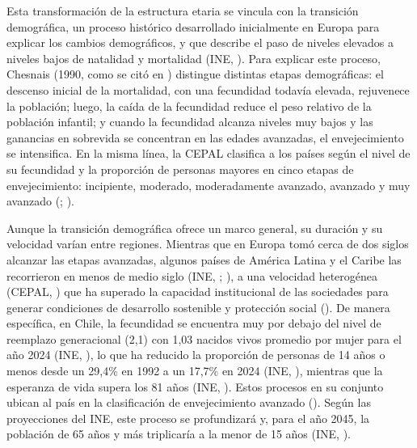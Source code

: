 \documentclass[
  spanish,
  a4paper,
  oneside]{scrbook}
\begin{document}
Esta transformación de la estructura etaria se vincula con la transición
demográfica, un proceso histórico desarrollado inicialmente en Europa
para explicar los cambios demográficos, y que describe el paso de
niveles elevados a niveles bajos de natalidad y mortalidad (INE,
). Para explicar este proceso,
Chesnais (1990, como se citó en
) distingue
distintas etapas demográficas: el descenso inicial de la mortalidad, con
una fecundidad todavía elevada, rejuvenece la población; luego, la caída
de la fecundidad reduce el peso relativo de la población infantil; y
cuando la fecundidad alcanza niveles muy bajos y las ganancias en
sobrevida se concentran en las edades avanzadas, el envejecimiento se
intensifica. En la misma línea, la CEPAL clasifica a los países según el
nivel de su fecundidad y la proporción de personas mayores en cinco
etapas de envejecimiento: incipiente, moderado, moderadamente avanzado,
avanzado y muy avanzado
(;
).

Aunque la transición demográfica ofrece un marco general, su duración y
su velocidad varían entre regiones. Mientras que en Europa tomó cerca de
dos siglos alcanzar las etapas avanzadas, algunos países de América
Latina y el Caribe las recorrieron en menos de medio siglo (INE,
;
),
a una velocidad heterogénea (CEPAL,
) que ha superado la capacidad
institucional de las sociedades para generar condiciones de desarrollo
sostenible y protección social
(). De
manera específica, en Chile, la fecundidad se encuentra muy por debajo
del nivel de reemplazo generacional (2,1) con 1,03 nacidos vivos
promedio por mujer para el año 2024 (INE,
), lo que ha reducido la proporción
de personas de 14 años o menos desde un 29,4\% en 1992 a un 17,7\% en
2024 (INE, ), mientras que la
esperanza de vida supera los 81 años (INE,
). Estos procesos en su conjunto
ubican al país en la clasificación de envejecimiento avanzado
(). Según
las proyecciones del INE, este proceso se profundizará y, para el año
2045, la población de 65 años y más triplicaría a la menor de 15 años
(INE, ).
\end{document}
